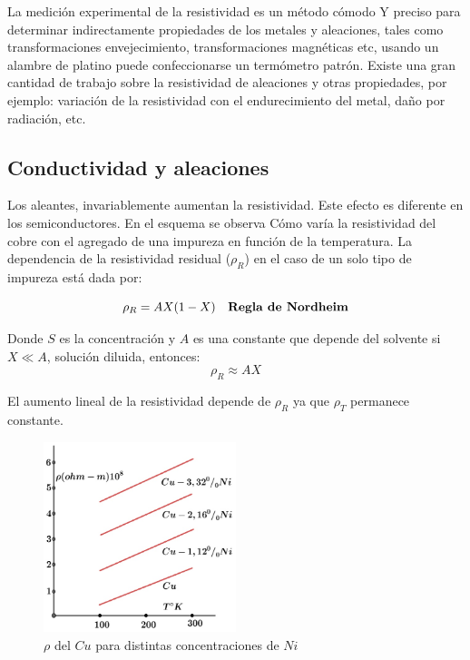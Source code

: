 La medición experimental de la resistividad es un método cómodo Y preciso para determinar indirectamente propiedades de los metales y aleaciones, tales como transformaciones envejecimiento, transformaciones magnéticas etc, usando un alambre de platino puede confeccionarse un termómetro patrón. Existe una gran cantidad de trabajo sobre la resistividad de aleaciones y otras propiedades, por ejemplo: variación de la resistividad con el endurecimiento del metal, daño por radiación, etc.

\subsection{Conductividad y aleaciones}

Los aleantes, invariablemente aumentan la resistividad. Este efecto es diferente en los semiconductores. En el esquema se observa Cómo varía la resistividad del cobre con el agregado de una impureza en función de la temperatura. La dependencia de la resistividad residual ($\rho_{R}$) en el caso de un solo tipo de impureza está dada por:

\begin{equation}
\rho_{R}=AX(1-X) \quad \text{\textbf{Regla de Nordheim}}
\end{equation}

Donde $S$ es la concentración y $A$ es una constante que depende del solvente si $X \ll A$, solución diluida, entonces:
\[
\rho_{R} \approx AX 
\]

El aumento lineal de la resistividad depende de $\rho_{R}$ ya que $\rho_{T}$ permanece constante.

\begin{figure}[H]
    \centering
    \includegraphics[width=0.5\textwidth]{./Figures/fig42}
	\caption{$\rho$ del $Cu$ para distintas concentraciones de $Ni$}
	\label{fig:42}
\end{figure}

